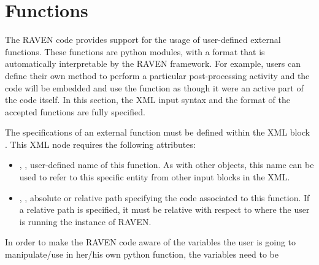 \section{Functions }
\label{sec:functions}

The RAVEN code provides support for the usage of user-defined external
functions.
%
These functions are python modules, with a format that is automatically
interpretable by the RAVEN framework.
%
For example, users can define their own method to perform a particular
post-processing activity and the code will be embedded and use the function as
though it were an active part of the code itself.
%
In this section, the XML input syntax and the format of the accepted functions 
are fully specified.

The specifications of an external function must be defined within the XML block
. This XML node requires the following attributes:
\vspace{-5mm}
\begin{itemize}
\itemsep0em
\item {}, , user-defined name of
this function. 
\nb As with other objects, this name can be used to refer to this
specific entity from other input blocks in the XML.
\item {}, , absolute or
relative path specifying the code associated to this function.
\nb If a relative path is specified, it must be relative with respect
to where the user is running the instance of RAVEN.
\end{itemize}
\vspace{-5mm}
In order to make the RAVEN code aware of the variables the user is going to
manipulate/use in her/his own python function, the variables need to be
